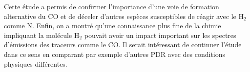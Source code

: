 Cette étude a permis de confirmer l'importance d'une voie de formation alternative du $\mathrm{CO}$ et de déceler d'autres espèces susceptibles de réagir avec le $\mathrm{H}_2$ comme $\mathrm{N}$. Enfin, on a montré qu'une connaissance plus fine de la chimie impliquant la molécule $\mathrm{H}_2$ pouvait avoir un impact important sur les spectres d'émissions des traceurs comme le $\mathrm{CO}$. Il serait intéressant de continuer l'étude dans ce sens en comparant par exemple d'autres PDR avec des conditions physiques différentes.





 


